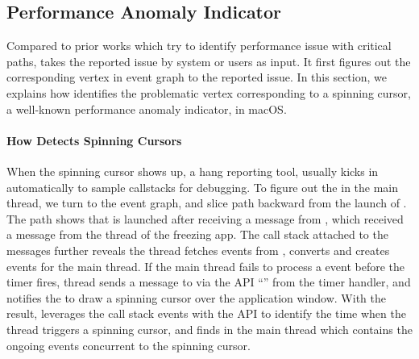 
\subsection{Performance Anomaly Indicator} \label{subsec:indicator}

Compared to prior works which try to identify performance issue with critical
paths, \xxx takes the reported issue by system or users as input. It first
figures out the corresponding vertex in event graph to the reported issue. In
this section, we explains how \xxx identifies the problematic vertex
corresponding to a spinning cursor, a well-known performance anomaly indicator,
in macOS.

\paragraph{How \xxx Detects Spinning Cursors}

When the spinning cursor shows up, a hang reporting tool, \spindump usually
kicks in automatically to sample callstacks for debugging. To figure out the
\spinningnode in the main thread, we turn to the event graph, and slice path
backward from the launch of \spindump. The path shows that \spindump is launched
after receiving a message from , which received a message
from the  thread of the freezing app. The call stack attached to
the messages further reveals the  thread fetches 
events from , converts and creates  events for the main
thread. If the main thread fails to process a  event before the timer
fires,  thread sends a message to  via the API
``'' from the timer handler, and 
notifies the  to draw a spinning cursor over the application
window. With the result, \xxx leverages the call stack events with the API to
identify the time when the  thread triggers a spinning cursor,
and finds \spinningnode in the main thread which contains the ongoing events
concurrent to the spinning cursor.
